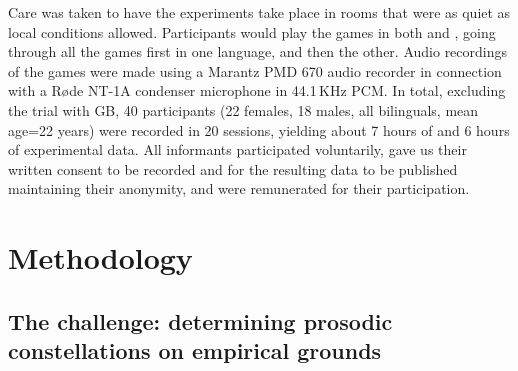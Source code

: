 \documentclass[output=paper]{LSP/langsci}
\begin{document}
Care was taken to have the experiments take place in rooms that were as quiet as local conditions allowed. Participants would play the games in both  and , going through all the games first in one language, and then the other. Audio recordings of the games were made using a Marantz PMD 670 audio recorder in connection with a Røde NT-1A condenser microphone in 44.1\,KHz PCM. In total, excluding the trial with GB, 40 participants (22 females, 18 males, all bilinguals, mean age=22 years) were recorded in 20 sessions, yielding about 7 hours of  and 6 hours of  experimental data. All informants participated voluntarily, gave us their written consent to be recorded and for the resulting data to be published maintaining their anonymity, and were remunerated for their participation.   

\section{Methodology}
\label{sec:buc:3}
\subsection{The challenge: determining prosodic constellations on empirical grounds}
\end{document}
